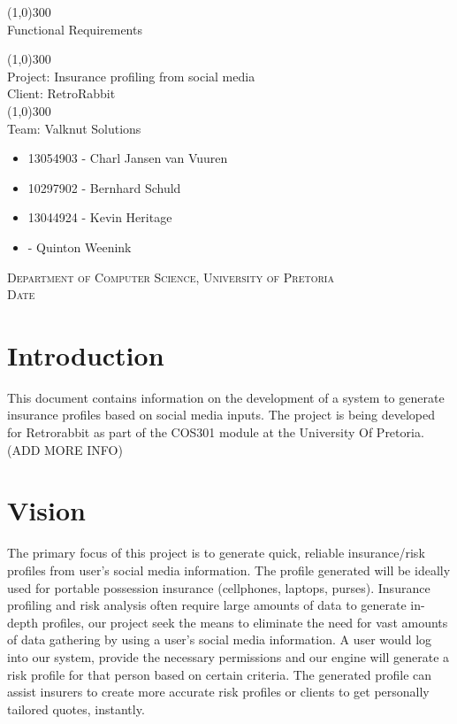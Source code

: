 \documentclass{article}
\begin{document}
	\begin{titlepage}
		\begin{center}
		
			\line(1,0){300}\\
			[6mm]
			\huge{
			Functional Requirements\\
			}
			
			\line(1,0){300}\\
			\huge{Project: Insurance profiling from social media\\
			Client: RetroRabbit} \\
			\line(1,0){300}\\
			\huge{Team: Valknut Solutions}
			
			\large
			{
			\begin{itemize}
			
				\item 13054903 - Charl Jansen van Vuuren 
				\item 10297902 - Bernhard Schuld      
				\item 13044924 - Kevin Heritage
				\item 	- Quinton Weenink
			\end{itemize}
			}
		\textsc{\large  Department of Computer Science, University of Pretoria}\\
		[0.5cm]
		\textsc{\large Date}	
		\end{center}

			
	\end{titlepage}
	\cleardoublepage
	\tableofcontents
	\cleardoublepage
	\listoffigures
	\cleardoublepage
\section{Introduction}
This document contains information on the development of a system to generate insurance profiles based on social media inputs. The project is being developed for Retrorabbit as part of the COS301 module at the University Of Pretoria.
(ADD MORE INFO)
\section{Vision}
The primary focus of this project is to generate quick, reliable insurance/risk profiles from user's social media information. The profile generated will be ideally used for portable possession insurance (cellphones, laptops, purses). Insurance profiling and risk analysis often require large amounts of data to generate in-depth profiles, our project seek the means to eliminate the need for vast amounts of data gathering by using a user's social media information. A user would log into our system, provide the necessary permissions and our engine will generate a risk profile for that person based on certain criteria. The generated profile can assist insurers to create more accurate risk profiles or clients to get personally tailored quotes, instantly.
\end{document}
